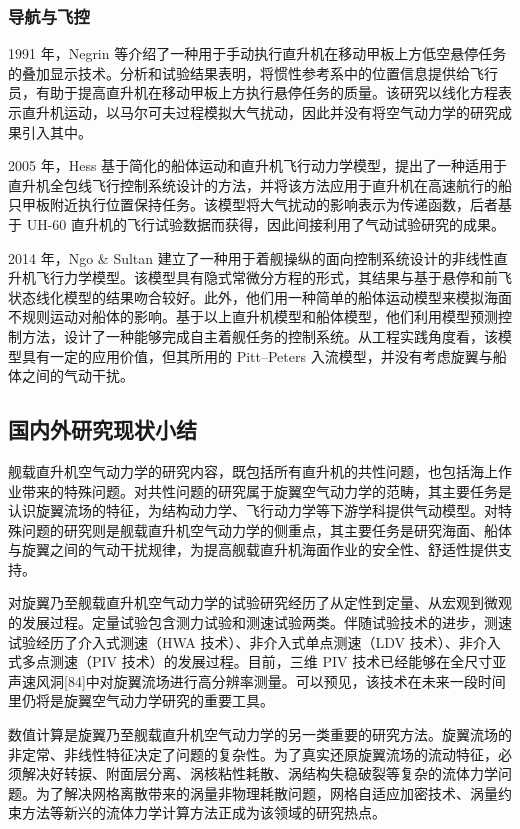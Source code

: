 \subsubsection{导航与飞控}

1991 年，Negrin 等介绍了一种用于手动执行直升机在移动甲板上方低空悬停任务的叠加显示技术。分析和试验结果表明，将惯性参考系中的位置信息提供给飞行员，有助于提高直升机在移动甲板上方执行悬停任务的质量。该研究以线化方程表示直升机运动，以马尔可夫过程模拟大气扰动，因此并没有将空气动力学的研究成果引入其中。

2005 年，Hess 基于简化的船体运动和直升机飞行动力学模型，提出了一种适用于直升机全包线飞行控制系统设计的方法，并将该方法应用于直升机在高速航行的船只甲板附近执行位置保持任务。该模型将大气扰动的影响表示为传递函数，后者基于
UH-60 直升机的飞行试验数据而获得，因此间接利用了气动试验研究的成果。 

2014 年，Ngo \& Sultan 建立了一种用于着舰操纵的面向控制系统设计的非线性直升机飞行力学模型。该模型具有隐式常微分方程的形式，其结果与基于悬停和前飞状态线化模型的结果吻合较好。此外，他们用一种简单的船体运动模型来模拟海面不规则运动对船体的影响。基于以上直升机模型和船体模型，他们利用模型预测控制方法，设计了一种能够完成自主着舰任务的控制系统。从工程实践角度看，该模型具有一定的应用价值，但其所用的
Pitt–Peters 入流模型，并没有考虑旋翼与船体之间的气动干扰。

\subsection{国内外研究现状小结}

舰载直升机空气动力学的研究内容，既包括所有直升机的共性问题，也包括海上作业带来的特殊问题。对共性问题的研究属于旋翼空气动力学的范畴，其主要任务是认识旋翼流场的特征，为结构动力学、飞行动力学等下游学科提供气动模型。对特殊问题的研究则是舰载直升机空气动力学的侧重点，其主要任务是研究海面、船体与旋翼之间的气动干扰规律，为提高舰载直升机海面作业的安全性、舒适性提供支持。

对旋翼乃至舰载直升机空气动力学的试验研究经历了从定性到定量、从宏观到微观的发展过程。定量试验包含测力试验和测速试验两类。伴随试验技术的进步，测速试验经历了介入式测速（HWA
技术）、非介入式单点测速（LDV 技术）、非介入式多点测速（PIV 技术）的发展过程。目前，三维 PIV 技术已经能够在全尺寸亚声速风洞{[}84{]}中对旋翼流场进行高分辨率测量。可以预见，该技术在未来一段时间里仍将是旋翼空气动力学研究的重要工具。

数值计算是旋翼乃至舰载直升机空气动力学的另一类重要的研究方法。旋翼流场的非定常、非线性特征决定了问题的复杂性。为了真实还原旋翼流场的流动特征，必须解决好转捩、附面层分离、涡核粘性耗散、涡结构失稳破裂等复杂的流体力学问题。为了解决网格离散带来的涡量非物理耗散问题，网格自适应加密技术、涡量约束方法等新兴的流体力学计算方法正成为该领域的研究热点。

